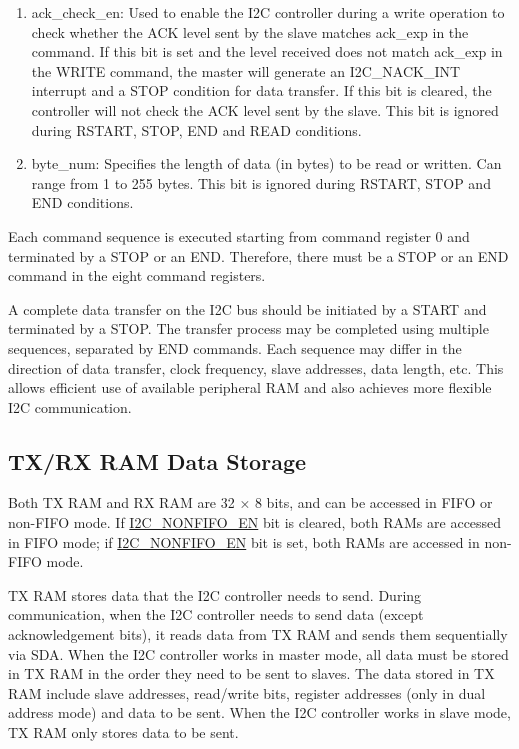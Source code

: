 \documentclass[main\_\_EN.tex]{subfiles}
\begin{document}
\begin{enumerate}
\item ack\_check\_en: Used to enable the I2C controller during a write operation to check whether the ACK level sent by the slave matches ack\_exp in the command. If this bit is set and the level received does not match ack\_exp in the WRITE command, the master will generate an I2C\_NACK\_INT interrupt and a STOP condition for data transfer. If this bit is cleared, the controller will not check the ACK level sent by the slave. This bit is ignored during RSTART, STOP, END and READ conditions.

\item byte\_num: Specifies the length of data (in bytes) to be read or written. Can range from 1 to 255 bytes. This bit is ignored during RSTART, STOP and END conditions.

\end{enumerate}

Each command sequence is executed starting from command register 0 and terminated by a STOP or an END. Therefore, there must be a STOP or an END command in the eight command registers.

A complete data transfer on the I2C bus should be initiated by a START and terminated by a STOP. The transfer process may be completed using multiple sequences, separated by END commands. Each sequence may differ in the direction of data transfer, clock frequency, slave addresses, data length, etc. This allows efficient use of available peripheral RAM and also achieves more flexible I2C communication.

\subsection{TX/RX RAM Data Storage}\label{subsubsec:i2c-txrx}
Both TX RAM and RX RAM are 32 × 8 bits, and can be accessed in FIFO or non-FIFO mode. If \hyperref[fielddesc:I2CNONFIFOEN]{I2C\_NONFIFO\_EN} bit is cleared, both RAMs are accessed in FIFO mode; if \hyperref[fielddesc:I2CNONFIFOEN]{I2C\_NONFIFO\_EN} bit is set, both RAMs are accessed in non-FIFO mode.

TX RAM stores data that the I2C controller needs to send. During communication, when the I2C controller needs to send data (except acknowledgement bits), it reads data from TX RAM and sends them sequentially via SDA. When the I2C controller works in master mode, all data must be stored in TX RAM in the order they need to be sent to slaves. The data stored in TX RAM include slave addresses, read/write bits, register addresses (only in dual address mode) and data to be sent. When the I2C controller works in slave mode, TX RAM only stores data to be sent.
\end{document}
